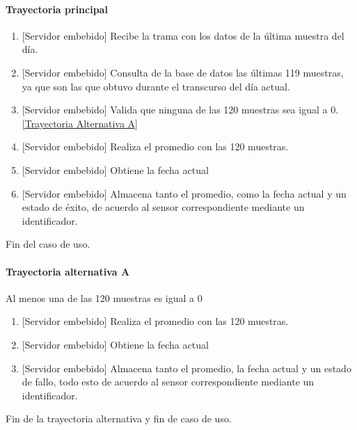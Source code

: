 \paragraph{Trayectoria principal}
	\begin{enumerate}
		\item {[Servidor embebido]} Recibe la trama con los datos de la última muestra del día.
		\item  {[Servidor embebido]} Consulta de la base de datos las últimas 119 muestras, ya que son las que obtuvo durante el transcurso del día actual.
		\item {[Servidor embebido]} Valida que ninguna de las 120 muestras sea igual a 0. \hyperref[SUB-M-CU1.1:TA]{[Trayectoria Alternativa A]}
		\item {[Servidor embebido]} Realiza el promedio con las 120 muestras.
		\item {[Servidor embebido]} Obtiene la fecha actual
		\item {[Servidor embebido]} Almacena tanto el promedio, como la fecha actual y un estado de éxito, de acuerdo al sensor correspondiente mediante un identificador.
	\end{enumerate}
	Fin del caso de uso.

\paragraph{Trayectoria alternativa A} \label{SUB-M-CU1.1:TA}
	Al menos una de las 120 muestras es igual a 0
	\begin{enumerate}[label=A\arabic*.]
		\item {[Servidor embebido]} Realiza el promedio con las 120 muestras.
		\item {[Servidor embebido]} Obtiene la fecha actual
		\item {[Servidor embebido]} Almacena tanto el promedio, la fecha actual y un estado de fallo, todo esto de acuerdo al sensor correspondiente mediante un identificador.
	\end{enumerate}
	Fin de la trayectoria alternativa y fin de caso de uso.
